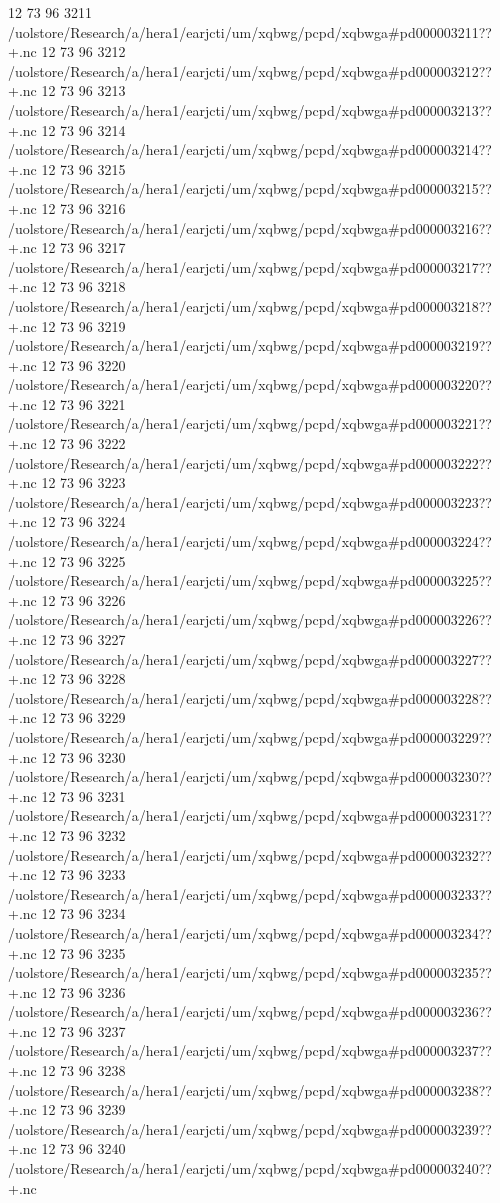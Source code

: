12 73 96
3211
/uolstore/Research/a/hera1/earjcti/um/xqbwg/pcpd/xqbwga#pd000003211??+.nc
12 73 96
3212
/uolstore/Research/a/hera1/earjcti/um/xqbwg/pcpd/xqbwga#pd000003212??+.nc
12 73 96
3213
/uolstore/Research/a/hera1/earjcti/um/xqbwg/pcpd/xqbwga#pd000003213??+.nc
12 73 96
3214
/uolstore/Research/a/hera1/earjcti/um/xqbwg/pcpd/xqbwga#pd000003214??+.nc
12 73 96
3215
/uolstore/Research/a/hera1/earjcti/um/xqbwg/pcpd/xqbwga#pd000003215??+.nc
12 73 96
3216
/uolstore/Research/a/hera1/earjcti/um/xqbwg/pcpd/xqbwga#pd000003216??+.nc
12 73 96
3217
/uolstore/Research/a/hera1/earjcti/um/xqbwg/pcpd/xqbwga#pd000003217??+.nc
12 73 96
3218
/uolstore/Research/a/hera1/earjcti/um/xqbwg/pcpd/xqbwga#pd000003218??+.nc
12 73 96
3219
/uolstore/Research/a/hera1/earjcti/um/xqbwg/pcpd/xqbwga#pd000003219??+.nc
12 73 96
3220
/uolstore/Research/a/hera1/earjcti/um/xqbwg/pcpd/xqbwga#pd000003220??+.nc
12 73 96
3221
/uolstore/Research/a/hera1/earjcti/um/xqbwg/pcpd/xqbwga#pd000003221??+.nc
12 73 96
3222
/uolstore/Research/a/hera1/earjcti/um/xqbwg/pcpd/xqbwga#pd000003222??+.nc
12 73 96
3223
/uolstore/Research/a/hera1/earjcti/um/xqbwg/pcpd/xqbwga#pd000003223??+.nc
12 73 96
3224
/uolstore/Research/a/hera1/earjcti/um/xqbwg/pcpd/xqbwga#pd000003224??+.nc
12 73 96
3225
/uolstore/Research/a/hera1/earjcti/um/xqbwg/pcpd/xqbwga#pd000003225??+.nc
12 73 96
3226
/uolstore/Research/a/hera1/earjcti/um/xqbwg/pcpd/xqbwga#pd000003226??+.nc
12 73 96
3227
/uolstore/Research/a/hera1/earjcti/um/xqbwg/pcpd/xqbwga#pd000003227??+.nc
12 73 96
3228
/uolstore/Research/a/hera1/earjcti/um/xqbwg/pcpd/xqbwga#pd000003228??+.nc
12 73 96
3229
/uolstore/Research/a/hera1/earjcti/um/xqbwg/pcpd/xqbwga#pd000003229??+.nc
12 73 96
3230
/uolstore/Research/a/hera1/earjcti/um/xqbwg/pcpd/xqbwga#pd000003230??+.nc
12 73 96
3231
/uolstore/Research/a/hera1/earjcti/um/xqbwg/pcpd/xqbwga#pd000003231??+.nc
12 73 96
3232
/uolstore/Research/a/hera1/earjcti/um/xqbwg/pcpd/xqbwga#pd000003232??+.nc
12 73 96
3233
/uolstore/Research/a/hera1/earjcti/um/xqbwg/pcpd/xqbwga#pd000003233??+.nc
12 73 96
3234
/uolstore/Research/a/hera1/earjcti/um/xqbwg/pcpd/xqbwga#pd000003234??+.nc
12 73 96
3235
/uolstore/Research/a/hera1/earjcti/um/xqbwg/pcpd/xqbwga#pd000003235??+.nc
12 73 96
3236
/uolstore/Research/a/hera1/earjcti/um/xqbwg/pcpd/xqbwga#pd000003236??+.nc
12 73 96
3237
/uolstore/Research/a/hera1/earjcti/um/xqbwg/pcpd/xqbwga#pd000003237??+.nc
12 73 96
3238
/uolstore/Research/a/hera1/earjcti/um/xqbwg/pcpd/xqbwga#pd000003238??+.nc
12 73 96
3239
/uolstore/Research/a/hera1/earjcti/um/xqbwg/pcpd/xqbwga#pd000003239??+.nc
12 73 96
3240
/uolstore/Research/a/hera1/earjcti/um/xqbwg/pcpd/xqbwga#pd000003240??+.nc
